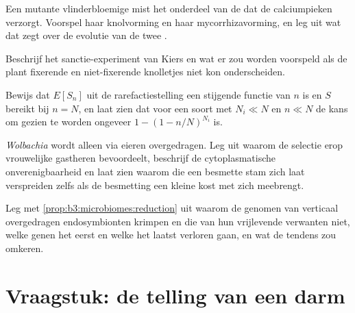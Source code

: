 \begin{exercise}[$\star\star$]\label{exo:b3:microbiomes:8}
Een mutante vlinderbloemige mist het onderdeel van de  dat de calciumpieken verzorgt. Voorspel haar
knolvorming en haar mycorrhizavorming, en leg uit wat dat zegt over de
evolutie van de twee .
\end{exercise}

\begin{exercise}[$\star\star$]\label{exo:b3:microbiomes:9}
Beschrijf het sanctie-experiment van Kiers en wat er zou worden
voorspeld als de plant fixerende en niet-fixerende knolletjes niet kon
onderscheiden.
\end{exercise}

\begin{exercise}[$\star\star\star$]\label{exo:b3:microbiomes:10}
Bewijs dat $E[S_{n}]$ uit de rarefactiestelling een stijgende functie
van $n$ is en $S$ bereikt bij $n = N$, en laat zien dat voor een soort
met $N_{i} \ll N$ en $n \ll N$ de kans om gezien te worden ongeveer
$1 - (1 - n/N)^{N_{i}}$ is.
\end{exercise}

\begin{exercise}[$\star\star\star$]\label{exo:b3:microbiomes:11}
\emph{Wolbachia} wordt alleen via eieren overgedragen. Leg uit waarom
de selectie erop vrouwelijke gastheren bevoordeelt, beschrijf de
cytoplasmatische onverenigbaarheid en laat zien waarom die een besmette
stam zich laat verspreiden zelfs als de besmetting een kleine kost met
zich meebrengt.
\end{exercise}

\begin{exercise}[$\star\star\star$]\label{exo:b3:microbiomes:12}
Leg met \cref{prop:b3:microbiomes:reduction} uit waarom de genomen van
verticaal overgedragen endosymbionten krimpen en die van hun
vrijlevende verwanten niet, welke genen het eerst en welke het laatst
verloren gaan, en wat de tendens zou omkeren.
\end{exercise}

\section{Vraagstuk: de telling van een darm}

